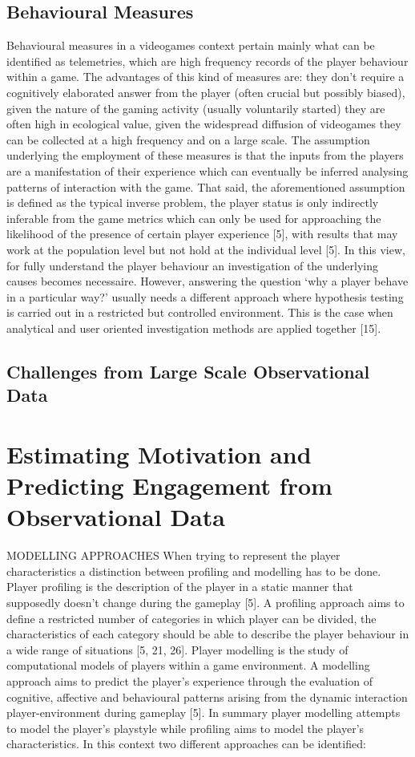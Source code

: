     \subsection{Behavioural Measures}
    \label{behavioural_indices}
    Behavioural measures in a videogames context pertain mainly what can be identified as telemetries, which are high frequency records of the player behaviour within a game. The advantages of this kind of measures are: they don’t require a cognitively elaborated answer from the player (often crucial but possibly biased), given the nature of the gaming activity (usually voluntarily started) they are often high in ecological value, given the widespread diffusion of videogames they can be collected at a high frequency and on a large scale. The assumption underlying the employment of these measures is that the inputs from the players are a manifestation of their experience which can eventually be inferred analysing patterns of interaction with the game. That said, the aforementioned assumption is defined as the typical inverse problem, the player status is only indirectly inferable from the game metrics which can only be used for approaching the likelihood of the presence of certain player experience [5], with results that may work at the population level but not hold at the individual level [5]. In this view, for fully understand the player behaviour an investigation of the underlying causes becomes necessaire. However, answering the question ‘why a player behave in a particular way?’ usually needs a different approach where hypothesis testing is carried out in a restricted but controlled environment. This is the case when analytical and user oriented investigation methods are applied together [15].
    \subsection{Challenges from Large Scale Observational Data}
    \label{challenges_large_scale}
    \lorem

\section{Estimating Motivation and Predicting Engagement from Observational Data}
\label{estpred_motivation_engagement}
MODELLING APPROACHES
When trying to represent the player characteristics a distinction between profiling and modelling has to be done. Player profiling is the description of the player in a static manner that supposedly doesn’t change during the gameplay [5]. A profiling approach aims to define a restricted number of categories in which player can be divided, the characteristics of each category should be able to describe the player behaviour in a wide range of situations [5, 21, 26]. Player modelling is the study of computational models of players within a game environment. A modelling approach aims to predict the player’s experience through the evaluation of cognitive, affective and behavioural patterns arising from the dynamic interaction player-environment during gameplay [5]. In summary player modelling attempts to model the player’s playstyle while profiling aims to model the player’s characteristics. In this context two different approaches can be identified:

